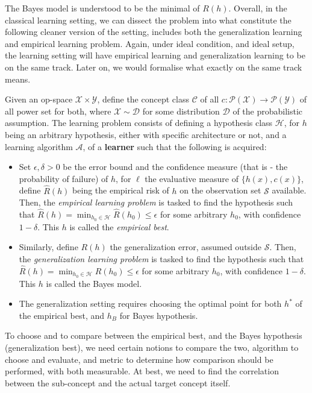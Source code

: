 \documentclass[
  journal=largetwo,
  year=2025,
  volume=37,
]{cup-journal}
\begin{document}
The Bayes model is understood to be the minimal of $R(h)$. Overall, in the classical learning setting, we can dissect the problem into what constitute the following cleaner version of the setting, includes both the generalization learning and empirical learning problem. Again, under ideal condition, and ideal setup, the learning setting will have empirical learning and generalization learning to be on the same track. Later on, we would formalise what exactly on the same track means. 

\begin{setting}
    Given an op-space $\mathcal{X}\times\mathcal{Y}$, define the concept class $\mathcal{C}$ of all $c: \mathcal{P}(\mathcal{X})\to \mathcal{P}(\mathcal{Y})$ of all power set for both, where $\mathcal{X}\sim \mathcal{D}$ for some distribution $\mathcal{D}$ of the probabilistic assumption. The learning problem consists of defining a hypothesis class $\mathcal{H}$, for $h$ being an arbitrary hypothesis, either with specific architecture or not, and a learning algorithm $\mathcal{A}$, of a \textbf{learner} such that the following is acquired: 
    \begin{itemize}
        \item Set $\epsilon,\delta> 0$ be the error bound and the confidence measure (that is - the probability of failure) of $h$, for $\ell$ the evaluative measure of $\{h(x),c(x)\}$, define $\hat{R}(h)$ being the empirical risk of $h$ on the observation set $\mathcal{S}$ available. Then, the \textit{empirical learning problem} is tasked to find the hypothesis such that $\hat{R}(h) = \min_{h_{0}\in \mathcal{H}}\hat{R}(h_{0})\leq \epsilon$ for some arbitrary $h_{0}$, with confidence $1-\delta$. This $h$ is called the \textit{empirical best}. 
        \item Similarly, define $R(h)$ the generalization error, assumed outside $\mathcal{S}$. Then, the \textit{generalization learning problem} is tasked to find the hypothesis such that $\hat{R}(h) = \min_{h_{0}\in \mathcal{H}}R(h_{0})\leq \epsilon$ for some arbitrary $h_{0}$, with confidence $1-\delta$. This $h$ is called the Bayes model. 
        \item The generalization setting requires choosing the optimal point for both $h^{*}$ of the empirical best, and $h_{B}$ for Bayes hypothesis. 
    \end{itemize} 
\end{setting}
To choose and to compare between the empirical best, and the Bayes hypothesis (generalization best), we need certain notions to compare the two, algorithm to choose and evaluate, and metric to determine how comparison should be performed, with both measurable. At best, we need to find the correlation between the sub-concept and the actual target concept itself. 
\end{document}
